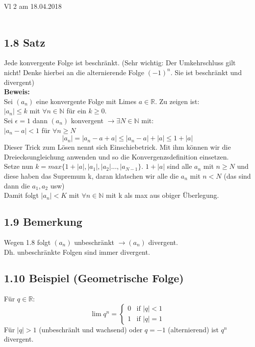 \documentclass[12pt]{article}
\begin{document}
Vl 2 am 18.04.2018\\
\\
\subsection*{1.8 Satz}
Jede konvergente Folge ist beschränkt. 
(Sehr wichtig: Der Umkehrschluss gilt nicht! Denke hierbei an die alternierende Folge $(-1)^n$. Sie ist beschränkt und divergent)\\
\textbf{Beweis:}\\
Sei $(a_n)$ eine konvergente Folge mit Limes $a\in \mathbb{R}$. Zu zeigen ist: \\
$|a_n| \leq k$ mit $\forall n \in \mathbb{N}$ für ein $k \geq 0$.\\
Sei $\epsilon = 1$ dann $(a_n)$ konvergent $\rightarrow \exists N \in \mathbb{N}$ mit:\\
$|a_n - a| < 1$ für $\forall n \geq N$
$$ |a_n| = |a_n - a + a| \leq |a_n - a| + |a| \leq 1 + |a| $$
Dieser Trick zum Lösen nennt sich Einschiebetrick. Mit ihm können wir die Dreiecksungleichung anwenden und so die Konvergenzsdefinition einsetzen. \\
Setze nun $k = max\{1 + |a|, |a_1|, |a_2|...,|a_{N-1}\}$. $1+|a|$ sind alle $a_n$ mit $n \geq N$ und diese haben das Supremum k, daran klatschen wir alle die $a_n$ mit $n<N$ (das sind dann die $a_1, a_2$ usw)\\
Damit folgt $|a_n| < K$ mit $\forall n \in \mathbb{N}$ mit k als max aus obiger Überlegung. 

\subsection*{1.9 Bemerkung}
Wegen 1.8 folgt $(a_n)$ unbeschränkt $\rightarrow (a_n)$ divergent. \\
Dh. unbeschränkte Folgen sind immer divergent. 

\subsection*{1.10 Beispiel (Geometrische Folge)}
Für $q\in \mathbb{R}$: 
\[
\lim q^n = 
\begin{cases} 
0 & \text{if } |q|<1 \\
1       & \text{if } |q|=1
\end{cases}\]
Für $|q| > 1$ (unbeschränlt und wachsend) oder $q= -1$ (alternierend) ist $q^n$ divergent. \\
\end{document}
